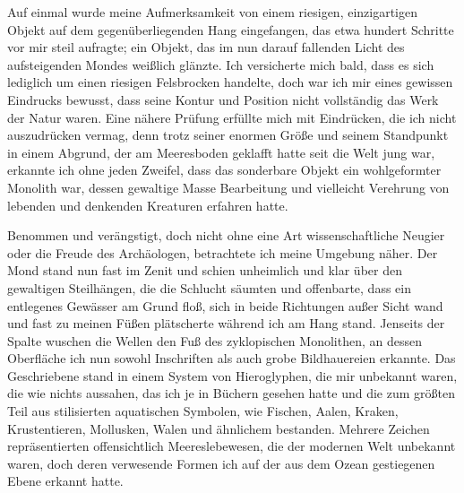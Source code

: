 \documentclass[a4paper]{memoir}
\begin{document}
Auf einmal wurde meine Aufmerksamkeit von einem riesigen, einzigartigen Objekt  auf dem gegenüberliegenden Hang eingefangen, das etwa hundert Schritte vor mir steil aufragte; ein Objekt, das im nun darauf fallenden Licht des aufsteigenden Mondes weißlich glänzte. Ich versicherte mich bald, dass es sich lediglich um einen riesigen Felsbrocken handelte, doch war ich mir eines gewissen Eindrucks bewusst, dass seine Kontur und Position nicht vollständig das Werk der Natur waren. Eine nähere Prüfung erfüllte mich mit Eindrücken, die ich nicht auszudrücken vermag, denn trotz seiner enormen Größe und seinem Standpunkt in einem Abgrund, der am Meeresboden geklafft hatte seit die Welt jung war, erkannte ich ohne jeden Zweifel, dass das sonderbare Objekt ein wohlgeformter Monolith war, dessen gewaltige Masse Bearbeitung und vielleicht Verehrung von lebenden und denkenden Kreaturen erfahren hatte.

Benommen und verängstigt, doch nicht ohne eine Art wissenschaftliche Neugier oder die Freude des Archäologen, betrachtete ich meine Umgebung näher. Der Mond stand nun fast im Zenit und schien unheimlich und klar über den gewaltigen Steilhängen, die die Schlucht säumten und offenbarte, dass ein entlegenes Gewässer am Grund floß, sich in beide Richtungen außer Sicht wand und fast zu meinen Füßen plätscherte während ich am Hang stand. Jenseits der Spalte wuschen die Wellen den Fuß des zyklopischen Monolithen, an dessen Oberfläche ich nun sowohl Inschriften als auch grobe Bildhauereien erkannte. Das Geschriebene stand in einem System von Hieroglyphen, die mir unbekannt waren, die wie nichts aussahen, das ich je in Büchern gesehen hatte und die zum größten Teil aus stilisierten aquatischen Symbolen, wie Fischen, Aalen, Kraken, Krustentieren, Mollusken, Walen und ähnlichem bestanden. Mehrere Zeichen repräsentierten offensichtlich Meereslebewesen, die der modernen Welt unbekannt waren, doch deren verwesende Formen ich auf der aus dem Ozean gestiegenen Ebene erkannt hatte.
\end{document}
